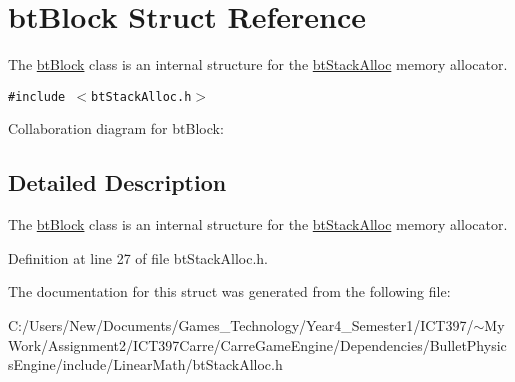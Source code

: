 \hypertarget{structbt_block}{
\section{btBlock Struct Reference}
\label{structbt_block}
}
The \hyperlink{structbt_block}{btBlock} class is an internal structure for the \hyperlink{classbt_stack_alloc}{btStackAlloc} memory allocator.  


{\tt \#include $<$btStackAlloc.h$>$}

Collaboration diagram for btBlock:

\subsection{Detailed Description}
The \hyperlink{structbt_block}{btBlock} class is an internal structure for the \hyperlink{classbt_stack_alloc}{btStackAlloc} memory allocator. 

Definition at line 27 of file btStackAlloc.h.

The documentation for this struct was generated from the following file:\begin{CompactItemize}
\item 
C:/Users/New/Documents/Games\_\-Technology/Year4\_\-Semester1/ICT397/$\sim$My Work/Assignment2/ICT397Carre/CarreGameEngine/Dependencies/BulletPhysicsEngine/include/LinearMath/btStackAlloc.h\end{CompactItemize}
